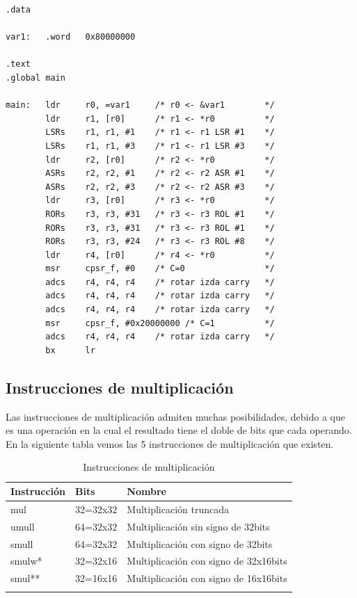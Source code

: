 \begin{lstlisting}[caption={Código del programa intro4.s},label={lst:codigoPract4}]
.data

var1:   .word   0x80000000

.text
.global main

main:   ldr     r0, =var1     /* r0 <- &var1        */
        ldr     r1, [r0]      /* r1 <- *r0          */
        LSRs    r1, r1, #1    /* r1 <- r1 LSR #1    */
        LSRs    r1, r1, #3    /* r1 <- r1 LSR #3    */
        ldr     r2, [r0]      /* r2 <- *r0          */
        ASRs    r2, r2, #1    /* r2 <- r2 ASR #1    */
        ASRs    r2, r2, #3    /* r2 <- r2 ASR #3    */
        ldr     r3, [r0]      /* r3 <- *r0          */
        RORs    r3, r3, #31   /* r3 <- r3 ROL #1    */
        RORs    r3, r3, #31   /* r3 <- r3 ROL #1    */
        RORs    r3, r3, #24   /* r3 <- r3 ROL #8    */
        ldr     r4, [r0]      /* r4 <- *r0          */
        msr     cpsr_f, #0    /* C=0                */
        adcs    r4, r4, r4    /* rotar izda carry   */
        adcs    r4, r4, r4    /* rotar izda carry   */
        adcs    r4, r4, r4    /* rotar izda carry   */
        msr     cpsr_f, #0x20000000 /* C=1          */
        adcs    r4, r4, r4    /* rotar izda carry   */
        bx      lr
\end{lstlisting}

\subsection{Instrucciones de multiplicación}

Las instrucciones de multiplicación admiten muchas posibilidades, debido
a que es una operación en la cual el resultado tiene el doble de bits
que cada operando. En la siguiente tabla vemos las 5 instrucciones de
multiplicación que existen.

\begin{longtable}{| p{2.5cm} | p{2.5cm} | p{7cm} |}
\hline
{\bf Instrucción} & {\bf Bits} & {\bf Nombre} \\ \hline
mul    & 32=32x32 &  Multiplicación truncada \\ \hline
umull  & 64=32x32 & Multiplicación sin signo de 32bits \\ \hline
smull  & 64=32x32 & Multiplicación con signo de 32bits \\ \hline
smulw* & 32=32x16 & Multiplicación con signo de 32x16bits \\ \hline
smul** & 32=16x16 & Multiplicación con signo de 16x16bits \\ \hline
\caption{Instrucciones de multiplicación}
\label{list_mul}
\end{longtable}

